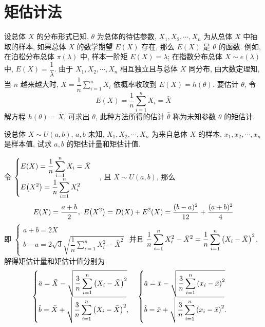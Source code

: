 \section{矩估计法}

设总体 $ X $ 的分布形式已知, $\theta $ 为总体的待估参数, $X_{1}, X_{2}, \cdots, X_{n} $ 为从总体 $ X $ 中抽取的样本, 
如果总体 $ X $ 的数学期望 $ E(X) $ 存在, 那么 $ E(X) $ 是 $ \theta $ 的函数. 例如, 在泊松分布总体 $ \pi(\lambda) $ 中, 
样本一阶矩 $ E(X)=\lambda$; 在指数分布总体 $ X \sim e(\lambda) $ 中, $E(X)=\dfrac{1}{\lambda}$.
由于 $ X_{1}, X_{2}, \cdots, X_{n} $ 相互独立且与总体 $ X $ 同分布, 由大数定理知, 当 $ n $ 越来越大时, $\displaystyle\bar{X}=\dfrac{1}{n} \sum_{i=1}^{n} X_{i} $
依概率收玫到 $ E(X)=h(\theta) .$
要估计 $ \theta $, 令
$$E(X)=\frac{1}{n} \sum_{i=1}^{n} X_{i}=\bar{X}$$
解方程 $h(\theta)=\bar{X}$, 可求出 $ \theta$, 此种方法所得的估计 $ \hat{\theta} $ 称为未知参数 $ \theta $ 的矩估计.

\begin{example}
    设总体 $ X \sim U(a, b)$, $ a, b $ 未知, $X_{1}, X_{2}, \cdots, X_{n} $ 为来自总体 $ X $ 的样本, $  x_{1} ,  x_{2}, \cdots, x_{n} $ 是样本值, 试求 $ a, b $ 的矩估计量和矩估计值.
\end{example}
\begin{solution}
    令 $\begin{cases}
            \displaystyle E(X)=\dfrac{1}{n}\sum_{i=1}^{n}X_i=\bar{X} \\
            \displaystyle E\qty(X^2)=\dfrac{1}{n}\sum_{i=1}^{n}X_i^2
        \end{cases}$, 且 $X\sim U(a,b)$, 那么
    $$E(X)=\dfrac{a+b}{2},~E\qty(X^2)=D(X)+E^2(X)=\dfrac{(b-a)^2}{12}+\dfrac{(a+b)^2}{4}$$
    即 $\begin{cases}
            a+b =2\bar{X} \\
            \displaystyle b-a=2\sqrt{3}\sqrt{\dfrac{1}{n}\sum_{i=1}^{n}X_i^2-\bar{X}^2}
        \end{cases}$ 并且 $\displaystyle\dfrac{1}{n}\sum_{i=1}^{n}X_i^2-\bar{X}^2=\dfrac{1}{n}\sum_{i=1}^{n}\qty(X_i-\bar{X})^2$, 
    解得矩估计量和矩估计值分别为
    $$\begin{cases}
            \displaystyle \hat{a}=\bar{X}-\sqrt{\dfrac{3}{n}\sum_{i=1}^{n}\qty(X_i-\bar{X})^2} \\
            \displaystyle \hat{b}=\bar{X}+\sqrt{\dfrac{3}{n}\sum_{i=1}^{n}\qty(X_i-\bar{X})^2},
        \end{cases}
        \begin{cases}
            \displaystyle \hat{a}=\bar{x}-\sqrt{\dfrac{3}{n}\sum_{i=1}^{n}\qty(x_i-\bar{x})^2} \\
            \displaystyle \hat{b}=\bar{x}+\sqrt{\dfrac{3}{n}\sum_{i=1}^{n}\qty(x_i-\bar{x})^2}.
        \end{cases}$$
\end{solution}

